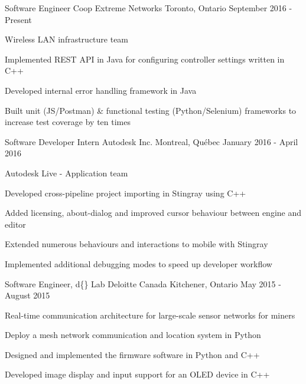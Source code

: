 


\begin{cventries}


\cventry
{Software Engineer Coop}
{Extreme Networks}
{Toronto, Ontario}
{September 2016 - Present}
{ %
Wireless LAN infrastructure team
\begin{cvitems}
\item[]
\item {Implemented REST API in Java for configuring controller settings written in C++}
\item {Developed internal error handling framework in Java}
\item {Built unit (JS/Postman) \& functional testing (Python/Selenium) frameworks to increase test coverage by ten times}
\end{cvitems}
}


\cventry
{Software Developer Intern}
{Autodesk Inc.}
{Montreal, Québec}
{January 2016 - April 2016}
{ %
Autodesk Live - Application team
\begin{cvitems}
\item[]
\item {Developed cross-pipeline project importing in Stingray using C++}
\item {Added licensing, about-dialog and improved cursor behaviour between engine and editor}
\item {Extended numerous behaviours and interactions to mobile with Stingray}
\item {Implemented additional debugging modes to speed up developer workflow}
\end{cvitems}
}


\cventry
{Software Engineer, d\{\} Lab}
{Deloitte Canada} %
{Kitchener, Ontario} %
{May 2015 - August 2015} %
{
Real-time communication architecture for large-scale sensor networks for miners
\begin{cvitems}
\item[]
\item {Deploy a mesh network communication and location system in Python}
\item {Designed and implemented the firmware software in Python and C++}
\item {Developed image display and input support for an OLED device in C++}
\end{cvitems}
}


\end{cventries}
